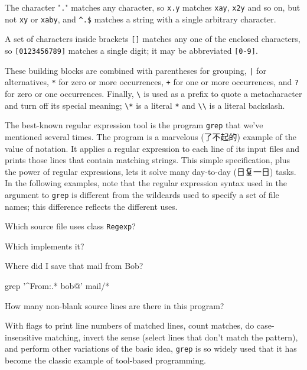 The character "\verb'.'" matches any character, so \verb'x.y' matches
\verb'xay', \verb'x2y' and so on, but not \verb'xy' or \verb'xaby', and
\verb'^.$' matches a string with a single arbitrary character.

A set of characters inside brackets \verb'[]' matches any one of the
enclosed characters, so \verb'[0123456789]' matches a single digit; it may
be abbreviated \verb'[0-9]'.

These building blocks are combined with parentheses for grouping, \verb'|'
for alternatives, \verb'*' for zero or more occurrences, \verb'+' for one or
more occurrences, and \verb'?' for zero or one occurrences. Finally, \verb'\'
is used as a prefix to quote a metacharacter and turn off its special
meaning; \verb'\*' is a literal \verb'*' and \verb'\\' is a literal
backslash.

The best-known regular expression tool is the program \verb'grep' that
we've mentioned several times. The program is a marvelous (了不起的)
example of the value of notation.  It applies a regular expression to each
line of its input files and prints those lines that contain matching
strings. This simple specification, plus the power of regular expressions,
lets it solve many day-to-day (日复一日) tasks. In the following examples,
note that the regular expression syntax used in the argument to \verb'grep'
is different from the wildcards used to specify a set of file names; this
difference reflects the different uses.

Which source file uses class \verb'Regexp'?
\begin{wellcode}
\end{wellcode}

Which implements it?
\begin{wellcode}
\end{wellcode}

Where did I save that mail from Bob?
\begin{wellcode}
    grep '^From:.* bob@' mail/*
\end{wellcode}

How many non-blank source lines are there in this program?
\begin{wellcode}
\end{wellcode}

With flags to print line numbers of matched lines, count matches, do case-
insensitive matching, invert the sense (select lines that don't match the
pattern), and perform other variations of the basic idea, \verb'grep' is so
widely used that it has become the classic example of tool-based
programming.

